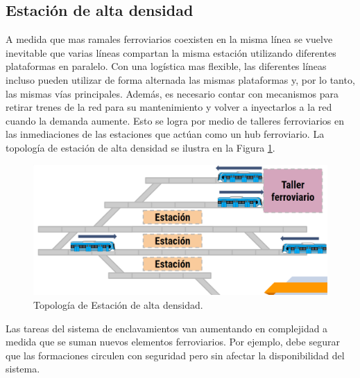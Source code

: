 \subsection{Estación de alta densidad}

A medida que mas ramales ferroviarios coexisten en la misma línea se vuelve inevitable que varias líneas compartan la misma estación utilizando diferentes plataformas en paralelo. Con una logística mas flexible, las diferentes líneas incluso pueden utilizar de forma alternada las mismas plataformas y, por lo tanto, las mismas vías principales. Además, es necesario contar con mecanismos para retirar trenes de la red para su mantenimiento y volver a inyectarlos a la red cuando la demanda aumente. Esto se logra por medio de talleres ferroviarios en las inmediaciones de las estaciones que actúan como un hub ferroviario. La topología de estación de alta densidad se ilustra en la Figura \ref{fig:hub_1}.

    \begin{figure}[h]
        \centering
        \includegraphics[width=1\textwidth]{Figuras/hub}
        \centering\caption{Topología de Estación de alta densidad.}
        \label{fig:hub_1}
    \end{figure}
    

Las tareas del sistema de enclavamientos van aumentando en complejidad a medida que se suman nuevos elementos ferroviarios. Por ejemplo, debe segurar que las formaciones circulen con seguridad pero sin afectar la disponibilidad del sistema. %
